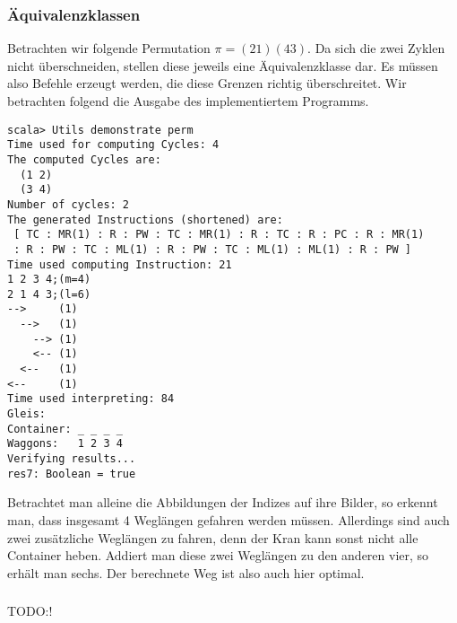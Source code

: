 \subsubsection*{Äquivalenzklassen}
Betrachten wir folgende Permutation $\pi = (2 1) (4 3)$.
Da sich die zwei Zyklen nicht überschneiden, stellen diese jeweils eine Äquivalenzklasse dar.
Es müssen also Befehle erzeugt werden, die diese Grenzen richtig überschreitet.
Wir betrachten folgend die Ausgabe des implementiertem Programms.
\begin{lstlisting}
scala> Utils demonstrate perm                
Time used for computing Cycles: 4
The computed Cycles are: 
  (1 2)
  (3 4)
Number of cycles: 2
The generated Instructions (shortened) are: 
 [ TC : MR(1) : R : PW : TC : MR(1) : R : TC : R : PC : R : MR(1)
 : R : PW : TC : ML(1) : R : PW : TC : ML(1) : ML(1) : R : PW ] 
Time used computing Instruction: 21
1 2 3 4;(m=4)
2 1 4 3;(l=6)
-->     (1)
  -->   (1)
    --> (1)
    <-- (1)
  <--   (1)
<--     (1)
Time used interpreting: 84
Gleis: 
Container: _ _ _ _
Waggons:   1 2 3 4
Verifying results...
res7: Boolean = true
\end{lstlisting}
Betrachtet man alleine die Abbildungen der Indizes auf ihre Bilder, so erkennt man, dass insgesamt 4 Weglängen gefahren werden müssen.
Allerdings sind auch zwei zusätzliche Weglängen zu fahren, denn der Kran kann sonst nicht alle Container heben.
Addiert man diese zwei Weglängen zu den anderen vier, so erhält man sechs.
Der berechnete Weg ist also auch hier optimal.
\subsubsection*{}
TODO:!
